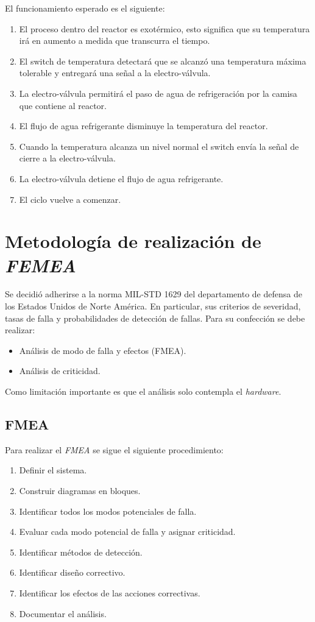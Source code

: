 \documentclass[
    11pt,
    spanish,
    a4paper
]{article}
\begin{document}
El funcionamiento esperado es el siguiente:

\begin{enumerate}
	\item El proceso dentro del reactor es exotérmico, esto significa que su temperatura irá en aumento a medida que transcurra el tiempo.
	\item El switch de temperatura detectará que se alcanzó una temperatura máxima tolerable y entregará una señal a la electro-válvula.
	\item La electro-válvula permitirá el paso de agua de refrigeración por la camisa que contiene al reactor.
	\item El flujo de agua refrigerante disminuye la temperatura del reactor.
	\item Cuando la temperatura alcanza un nivel normal el switch envía la señal de cierre a la electro-válvula.
	\item La electro-válvula detiene el flujo de agua refrigerante.
	\item El ciclo vuelve a comenzar.
\end{enumerate}

\section{Metodología de realización de \emph{FEMEA}}

Se decidió adherirse a la norma MIL-STD 1629 del departamento de defensa de los Estados Unidos de Norte América.
En particular, sus criterios de severidad, tasas de falla y probabilidades de detección de fallas.
Para su confección se debe realizar:

\begin{itemize}
	\item{Análisis de modo de falla y efectos (FMEA).}
	\item{Análisis de criticidad.}
\end{itemize}

Como limitación importante es que el análisis solo contempla el \emph{hardware}.

\subsection{FMEA}

Para realizar el \emph{FMEA} se sigue el siguiente procedimiento:

\begin{enumerate}
	\item Definir el sistema.
	\item Construir diagramas en bloques.
	\item Identificar todos los modos potenciales de falla.
	\item Evaluar cada modo potencial de falla y asignar criticidad.
	\item Identificar métodos de detección.
	\item Identificar diseño correctivo.
	\item Identificar los efectos de las acciones correctivas.
	\item Documentar el análisis.
\end{enumerate}
\end{document}
